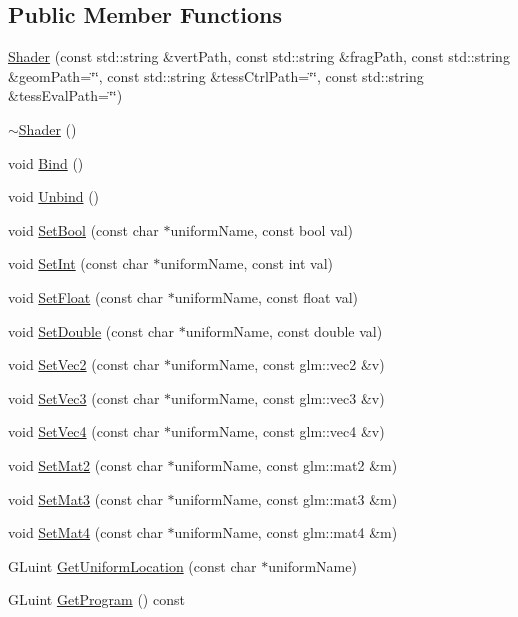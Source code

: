 \subsection*{Public Member Functions}
\begin{DoxyCompactItemize}
\item 
\mbox{\hyperlink{classec_1_1_shader_a8fe213cc5bf88e3959fd0334c384b9ab}{Shader}} (const std\+::string \&vert\+Path, const std\+::string \&frag\+Path, const std\+::string \&geom\+Path=\char`\"{}\char`\"{}, const std\+::string \&tess\+Ctrl\+Path=\char`\"{}\char`\"{}, const std\+::string \&tess\+Eval\+Path=\char`\"{}\char`\"{})
\item 
\mbox{\hyperlink{classec_1_1_shader_aff01df87e8a102f270b5b135a295e59d}{$\sim$\+Shader}} ()
\item 
void \mbox{\hyperlink{classec_1_1_shader_a8b5c8c4788d011a65d158ef8428d1ece}{Bind}} ()
\item 
void \mbox{\hyperlink{classec_1_1_shader_afec339096238f064093aa52f94c0259e}{Unbind}} ()
\item 
void \mbox{\hyperlink{classec_1_1_shader_a17cf7b3816cdc8c41ccefda08294e20e}{Set\+Bool}} (const char $\ast$uniform\+Name, const bool val)
\item 
void \mbox{\hyperlink{classec_1_1_shader_aa2df78739294d1815502bec14ea4a907}{Set\+Int}} (const char $\ast$uniform\+Name, const int val)
\item 
void \mbox{\hyperlink{classec_1_1_shader_aee1df257423576414f395004ecb11c02}{Set\+Float}} (const char $\ast$uniform\+Name, const float val)
\item 
void \mbox{\hyperlink{classec_1_1_shader_af2ce6812aa1db454168449a7a4e202f5}{Set\+Double}} (const char $\ast$uniform\+Name, const double val)
\item 
void \mbox{\hyperlink{classec_1_1_shader_a3bf37ff90f42307430e07cd9a213513f}{Set\+Vec2}} (const char $\ast$uniform\+Name, const glm\+::vec2 \&v)
\item 
void \mbox{\hyperlink{classec_1_1_shader_a10bd92bfcbfe0d65af1fa7fa85f1c14f}{Set\+Vec3}} (const char $\ast$uniform\+Name, const glm\+::vec3 \&v)
\item 
void \mbox{\hyperlink{classec_1_1_shader_a7ef02fde1aeef8a2e67e03fe33cce220}{Set\+Vec4}} (const char $\ast$uniform\+Name, const glm\+::vec4 \&v)
\item 
void \mbox{\hyperlink{classec_1_1_shader_a9119ca6857ef2cb77046e399bffcabcb}{Set\+Mat2}} (const char $\ast$uniform\+Name, const glm\+::mat2 \&m)
\item 
void \mbox{\hyperlink{classec_1_1_shader_a64b0b8886f81ff7c862800ac6a885553}{Set\+Mat3}} (const char $\ast$uniform\+Name, const glm\+::mat3 \&m)
\item 
void \mbox{\hyperlink{classec_1_1_shader_a8f549ed9012b1c2c38b8fa1692c5cad2}{Set\+Mat4}} (const char $\ast$uniform\+Name, const glm\+::mat4 \&m)
\item 
G\+Luint \mbox{\hyperlink{classec_1_1_shader_a643768533d2d2cf6ea5b10fcce8da680}{Get\+Uniform\+Location}} (const char $\ast$uniform\+Name)
\item 
G\+Luint \mbox{\hyperlink{classec_1_1_shader_a18c240d6a743d11d75973edc8cd05e82}{Get\+Program}} () const
\end{DoxyCompactItemize}


